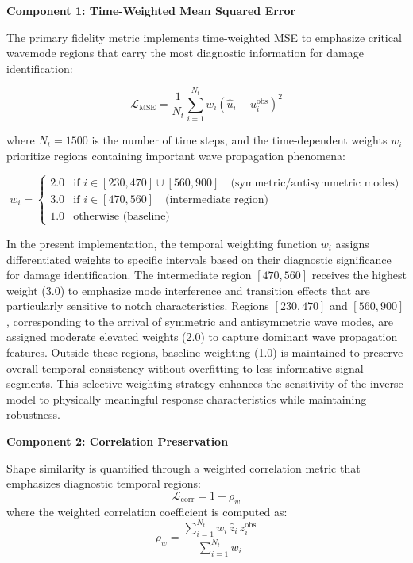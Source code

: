 \documentclass[12pt,a4paper]{report}
\begin{document}
\textbf{Component 1: Time-Weighted Mean Squared Error}

The primary fidelity metric implements time-weighted MSE to emphasize critical wavemode regions that carry the most diagnostic information for damage identification:

\begin{equation}
\mathcal{L}_{\text{MSE}} = \frac{1}{N_t} \sum_{i=1}^{N_t} w_i \left( \hat{u}_i - u_i^{\text{obs}} \right)^2
\label{eq:mse_loss}
\end{equation}

where $N_t = 1500$ is the number of time steps, and the time-dependent weights $w_i$ prioritize regions containing important wave propagation phenomena:

\begin{equation}
w_i = \begin{cases}
2.0 & \text{if } i \in [230, 470] \cup [560, 900] \quad \text{(symmetric/antisymmetric modes)} \\
3.0 & \text{if } i \in [470, 560] \quad \text{(intermediate region)} \\
1.0 & \text{otherwise (baseline)}
\end{cases}
\label{eq:time_weights}
\end{equation}

In the present implementation, the temporal weighting function $w_i$ assigns differentiated weights to specific intervals based on their diagnostic significance for damage identification. The intermediate region $[470, 560]$ receives the highest weight (3.0) to emphasize mode interference and transition effects that are particularly sensitive to notch characteristics. Regions $[230, 470]$ and $[560, 900]$, corresponding to the arrival of symmetric and antisymmetric wave modes, are assigned moderate elevated weights (2.0) to capture dominant wave propagation features. Outside these regions, baseline weighting (1.0) is maintained to preserve overall temporal consistency without overfitting to less informative signal segments. This selective weighting strategy enhances the sensitivity of the inverse model to physically meaningful response characteristics while maintaining robustness.



\textbf{Component 2: Correlation Preservation}

Shape similarity is quantified through a weighted correlation metric that emphasizes diagnostic temporal regions:
\begin{equation}
\mathcal{L}_{\text{corr}} = 1 - \rho_w
\label{eq:corr_loss}
\end{equation}
where the weighted correlation coefficient is computed as:
\begin{equation}
\rho_w = \frac{\sum_{i=1}^{N_t} w_i \, \hat{z}_i \, z_i^{\text{obs}}}{\sum_{i=1}^{N_t} w_i}
\label{eq:weighted_correlation}
\end{equation}
\end{document}
